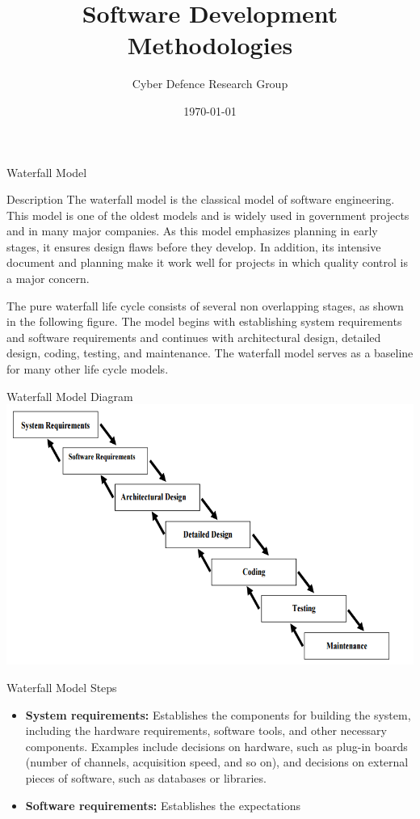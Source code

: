 \documentclass[final,hyperref={pdfpagelabels=false}]{beamer}
\title[Fancy Posters]{Software Development Methodologies }
\author[Ivan Burke]{Cyber Defence Research Group}
\institute[Council for Scientific and Industrial Research]{Defence, Peace, Safety and Security, \textit{Council for Scientific and Industrial Research}}
\date{\today}
\begin{document}
  \begin{frame}{ Waterfall Model} 
   
    \begin{block}{\large Description}
        The waterfall model is the classical model of software
        engineering. This model is one of the oldest models and is
        widely used in government projects and in many major
        companies. As this model emphasizes planning in early
        stages, it ensures design flaws before they develop. In
        addition, its intensive document and planning make it
        work well for projects in which quality control is a major
        concern.
        
        The pure waterfall life cycle consists of several non overlapping
        stages, as shown in the following figure. The
        model begins with establishing system requirements and
        software requirements and continues with architectural
        design, detailed design, coding, testing, and maintenance.
        The waterfall model serves as a baseline for many other
        life cycle models.
    \end{block}
     \begin{block}{\large Waterfall Model Diagram}
      \centering
        \includegraphics[width=.5\linewidth]{waterfall}
    \end{block}
    \vfill
    \begin{block}{\large Waterfall Model Steps}
        \begin{itemize}
            \item \textbf{ System requirements:} Establishes the components
                for building the system, including the hardware
                requirements, software tools, and other necessary
                components. Examples include decisions on
                hardware, such as plug-in boards (number of
                channels, acquisition speed, and so on), and decisions
                on external pieces of software, such as databases or
                libraries.
            \item \textbf{ Software requirements:} Establishes the expectations

\end{itemize}
\end{block}
\end{frame}
\end{document}
